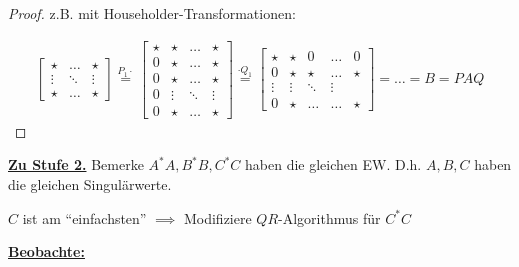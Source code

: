 \documentclass{book}
\begin{document}
            \begin{proof}
                z.B. mit Householder-Transformationen:

                \begin{align*}
                    \begin{bmatrix}
                        \star & \dots & \star \\
                        \vdots & \ddots & \vdots \\
                        \star & \dots  & \star
                    \end{bmatrix}\stackrel{P_1\cdot}{=}\begin{bmatrix}
                        \star & \star&\dots & \star \\
                        0& \star&\dots & \star \\
                        0&\star & \dots & \star \\
                        0&\vdots & \ddots & \vdots \\
                        0&\star & \dots  & \star
                    \end{bmatrix}
                    \stackrel{\cdot Q_1}{=}\begin{bmatrix}
                        \star & \star & 0 &\dots & 0\\
                        0 & \star & \star &\dots & \star \\
                        \vdots & \vdots &\ddots &\vdots\\
                        0&\star &\dots & \dots &\star
                    \end{bmatrix}=\dots = B=PAQ
                \end{align*}
            \end{proof}

            \underline{\textbf{Zu Stufe 2.}} Bemerke $A^* A, B^*B,C^*C$ haben die gleichen EW.
            D.h. $A,B,C$ haben die gleichen Singulärwerte. 
            
            $C$ ist am ``einfachsten'' $\implies$ Modifiziere $QR$-Algorithmus für $C^*C$

            \underline{\textbf{Beobachte:}}
\end{document}
